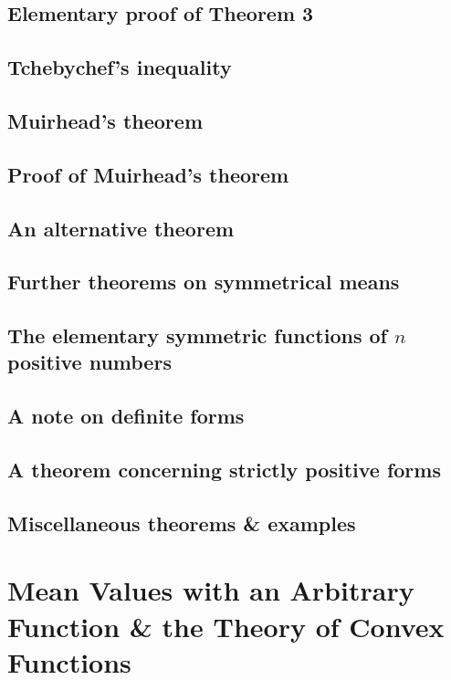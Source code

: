 \documentclass[oneside]{book}
\numberwithin{equation}{section}
\begin{document}
\subsection{Elementary proof of Theorem 3}

\subsection{Tchebychef's inequality}

\subsection{Muirhead's theorem}

\subsection{Proof of Muirhead's theorem}

\subsection{An alternative theorem}

\subsection{Further theorems on symmetrical means}

\subsection{The elementary symmetric functions of $n$ positive numbers}

\subsection{A note on definite forms}

\subsection{A theorem concerning strictly positive forms}

\subsection{Miscellaneous theorems \& examples}


\section{Mean Values with an Arbitrary Function \& the Theory of Convex Functions}
\end{document}
